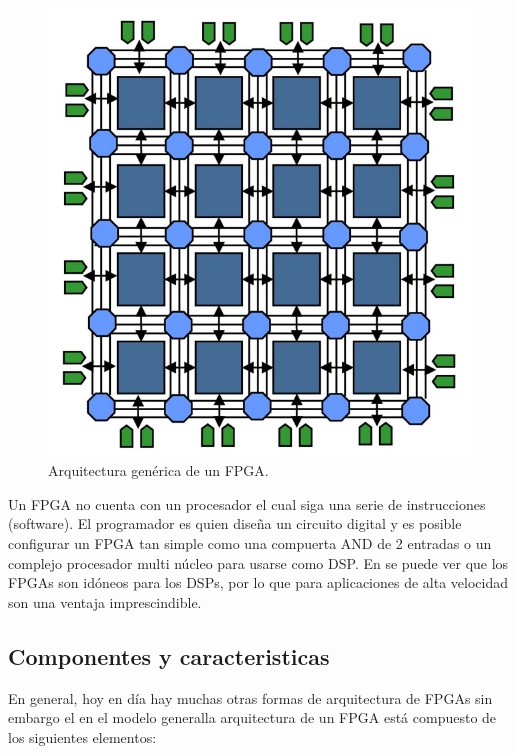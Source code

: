 \documentclass[twoside,spanish,ESP,MSc]{plantillaLabUPV}
\theoremstyle{definition}
\newcommand{\f}{FPGA }
\newcommand{\fs}{FPGAs }
\begin{document}
\begin{figure}[h]
\centering
\includegraphics[scale=0.3]{ima/arqf.png}
\caption{Arquitectura genérica de un FPGA.%
\label{arqf}}
\end{figure}

Un \f no cuenta con un procesador el cual siga una serie de instrucciones (software). El programador es quien diseña un circuito digital y es posible configurar un \f tan simple como una compuerta AND de 2 entradas o un complejo procesador multi núcleo para usarse como DSP. En \cite{bajaj} se puede ver que los \fs son idóneos para los DSPs, por lo que para aplicaciones de alta velocidad son una ventaja imprescindible.\\


\subsection{Componentes y caracteristicas}

En general, hoy en día hay muchas otras formas de arquitectura de FPGAs sin embargo el en el modelo generalla arquitectura de un \f está compuesto de los siguientes elementos:

\end{document}

